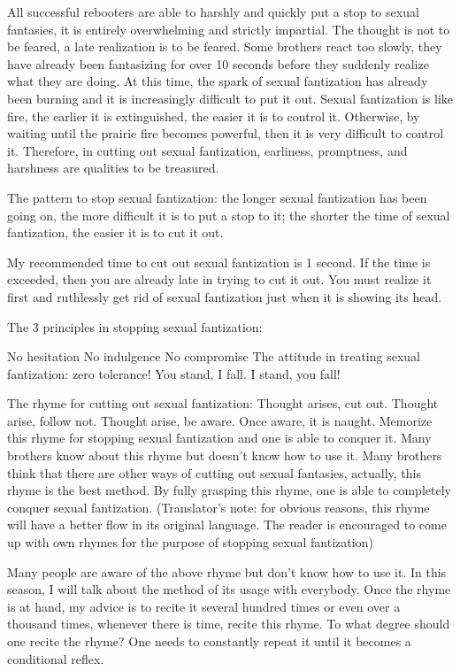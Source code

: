 \documentclass[
]{book}
\begin{document}
All successful rebooters are able to harshly and quickly put a stop to sexual fantasies, it is entirely overwhelming and strictly impartial. The thought is not to be feared, a late realization is to be feared. Some brothers react too slowly, they have already been fantasizing for over 10 seconds before they suddenly realize what they are doing. At this time, the spark of sexual fantization has already been burning and it is increasingly difficult to put it out. Sexual fantization is like fire, the earlier it is extinguished, the easier it is to control it. Otherwise, by waiting until the prairie fire becomes powerful, then it is very difficult to control it. Therefore, in cutting out sexual fantization, earliness, promptness, and harshness are qualities to be treasured.

The pattern to stop sexual fantization: the longer sexual fantization has been going on, the more difficult it is to put a stop to it; the shorter the time of sexual fantization, the easier it is to cut it out.

My recommended time to cut out sexual fantization is 1 second. If the time is exceeded, then you are already late in trying to cut it out. You must realize it first and ruthlessly get rid of sexual fantization just when it is showing its head.

The 3 principles in stopping sexual fantization:

No hesitation
No indulgence
No compromise
The attitude in treating sexual fantization: zero tolerance! You stand, I fall. I stand, you fall!

The rhyme for cutting out sexual fantization: Thought arises, cut out. Thought arise, follow not. Thought arise, be aware. Once aware, it is naught. Memorize this rhyme for stopping sexual fantization and one is able to conquer it. Many brothers know about this rhyme but doesn't know how to use it. Many brothers think that there are other ways of cutting out sexual fantasies, actually, this rhyme is the best method. By fully grasping this rhyme, one is able to completely conquer sexual fantization. (Translator's note: for obvious reasons, this rhyme will have a better flow in its original language. The reader is encouraged to come up with own rhymes for the purpose of stopping sexual fantization)

Many people are aware of the above rhyme but don't know how to use it. In this season, I will talk about the method of its usage with everybody. Once the rhyme is at hand, my advice is to recite it several hundred times or even over a thousand times, whenever there is time, recite this rhyme. To what degree should one recite the rhyme? One needs to constantly repeat it until it becomes a conditional reflex.
\end{document}
